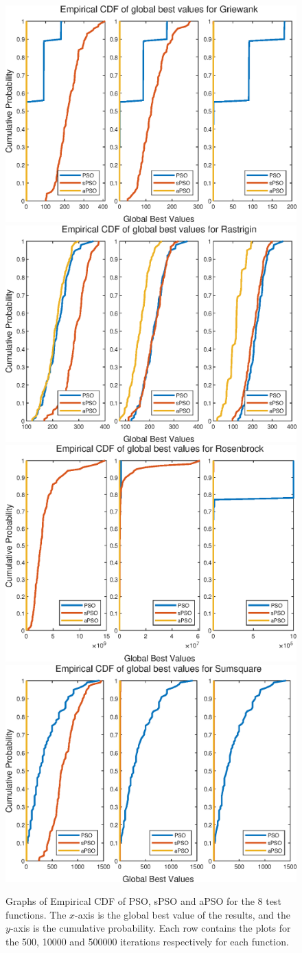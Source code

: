 \documentclass[12pt]{article}
\theoremstyle{definition}
\begin{document}
\begin{figure}[H]
    \ContinuedFloat
    \includegraphics[height=0.33\textwidth,width=\textwidth]{ecdfs/Griewank_500k.eps} \\ \bigskip
    \includegraphics[height=0.33\textwidth,width=\textwidth]{ecdfs/Rastrigin_500k.eps} \\ \bigskip
    \includegraphics[height=0.33\textwidth,width=\textwidth]{ecdfs/Rosenbrock_500k.eps} \\ \bigskip
    \includegraphics[height=0.33\textwidth,width=\textwidth]{ecdfs/Sumsquare_500k.eps}
    \caption{Graphs of Empirical CDF of PSO, sPSO and aPSO for the 8 test functions. The $x$-axis is the global best value of the results, and the $y$-axis is the cumulative probability. Each row contains the plots for the 500, 10000 and 500000 iterations respectively for each function.}
\end{figure}
\end{document}
